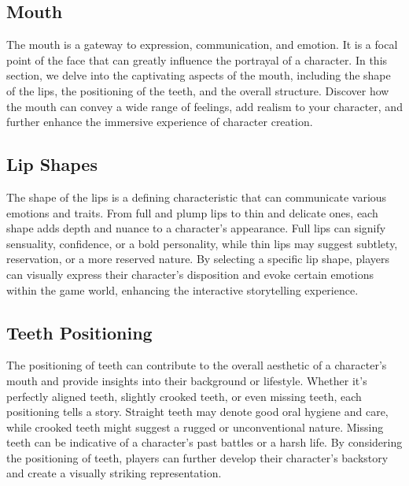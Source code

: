 \documentclass[12pt]{book}
\begin{document}
\subsection{\textbf{Mouth}}

The mouth is a gateway to expression, communication, and emotion. It is a focal point of the face that can greatly influence the portrayal of a character. In this section, we delve into the captivating aspects of the mouth, including the shape of the lips, the positioning of the teeth, and the overall structure. Discover how the mouth can convey a wide range of feelings, add realism to your character, and further enhance the immersive experience of character creation.

\subsection{\textbf{Lip Shapes}}

The shape of the lips is a defining characteristic that can communicate various emotions and traits. From full and plump lips to thin and delicate ones, each shape adds depth and nuance to a character's appearance. Full lips can signify sensuality, confidence, or a bold personality, while thin lips may suggest subtlety, reservation, or a more reserved nature. By selecting a specific lip shape, players can visually express their character's disposition and evoke certain emotions within the game world, enhancing the interactive storytelling experience.

\subsection{\textbf{Teeth Positioning}}

The positioning of teeth can contribute to the overall aesthetic of a character's mouth and provide insights into their background or lifestyle. Whether it's perfectly aligned teeth, slightly crooked teeth, or even missing teeth, each positioning tells a story. Straight teeth may denote good oral hygiene and care, while crooked teeth might suggest a rugged or unconventional nature. Missing teeth can be indicative of a character's past battles or a harsh life. By considering the positioning of teeth, players can further develop their character's backstory and create a visually striking representation.
\end{document}
